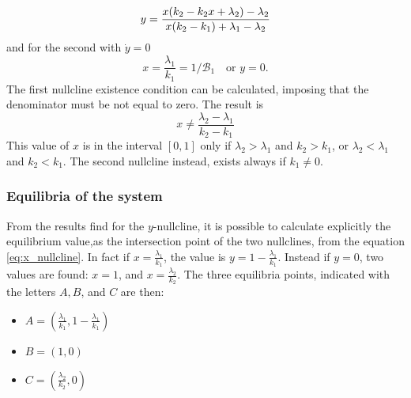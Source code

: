 \begin{equation}\\
\label{eq:x_nullcline}
 y = \frac{x(k_2 - k_2 x + \lambda_2) - \lambda_2}{x(k_2 - k_1)+ \lambda_1- \lambda_2}
\end{equation}
and for the second with $\dot{y} = 0$
\[x = \frac{\lambda_1}{k_1} = 1/\mathcal{B}_1 \quad \text{or } y = 0.
\]
The first nullcline existence condition can be calculated, imposing that the denominator must be not equal to zero. The result is
\[ x \neq \frac{\lambda_2-\lambda_1}{k_2 - k_1} \]
This value of $x$ is in the interval $[0,1]$ only if $\lambda_2>\lambda_1$ and $k_2 > k_1$, or $\lambda_2<\lambda_1$ and $k_2 < k_1$. The second nullcline instead, exists always if $k_1 \neq 0$.

\subsubsection{Equilibria of the system}
From the results find for the $y$-nullcline, it is possible to calculate explicitly the equilibrium value,as the intersection point of the two nullclines, from the equation \ref{eq:x_nullcline}. In fact if $x =\frac{\lambda_1}{k_1}$, the value is $y = 1 -\frac{\lambda_1}{k_1}$.
Instead if $y = 0$, two values are found: $x = 1$, and $x = \frac{\lambda_2}{k_2}$.
The three equilibria points, indicated with the letters $A,B$, and $C$ are then:
\begin{itemize}
	\item $A = (\frac{\lambda_1}{k_1}, 1-\frac{\lambda_1}{k_1})$
	\item $B = (1, 0)$
	\item $C = (\frac{\lambda_2}{k_2}, 0)$
\end{itemize}

